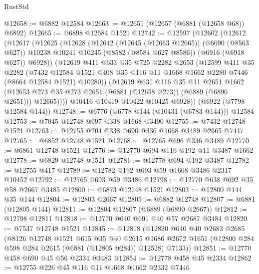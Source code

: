 \begin{lexlean}{RustStd}
\begin{coremodule}
@12658 := @6882 @12584
@12663 := @12651 (@12657 (@6881 (@12658 @68)) @6892)
@12665 := @6898 @12584 @1521
@12742 := @12597
    (@12602
      (@12612
        (@12617
          (@12625
            (@12628
              (@12642
                (@12645 (@12663 @12665))
                (@6690 (@8563 @627))
                @10238
                @10241
                @10245
                (@8582 (@8584 @627 @8586))
                (@6916 (@6918 @627))
                @6928))
            (@12619
              @411
              @633
              @35
              @725
              @2282
              @2653
              (@12599
                @411
                @35
                @2282
                (@7432
                  @12584
                  @1521
                  @408
                  @35
                  @116
                  @11
                  @1668
                  @1662
                  @2280
                  @7446
                  (@8664 @12584 @1521)
                  @10280))
              (@12619
                @631
                @116
                @35
                @11
                @2651
                @1662
                (@12653 @273 @35 @273 @2651 (@6881 (@12658 @273)) (@6889 (@6890 @2651)))
                @12665))))
        @10416
        @10419
        @10422
        @10425
        @6928))
    (@6922 (@7798 @12584 @144))
@12748 := @6776 (@6778 @144 (@10431 (@6783 @144))) @12584
@12753 := @7045 @12748 @697 @338 @1668 @3490
@12755 := @7432 @12748 @1521
@12763 := @12755 @204 @338 @696 @336 @1668 @3489 @2665 @7447
@12765 := @6852 @12748 @1521
@12768 := @12765 @696 @336 @3489
@12770 := @6861 @12748 @1521
@12776 := @12770 @694 @116 @192 @11 @3487 @1662
@12778 := @6829 @12748 @1521
@12781 := @12778 @694 @192 @3487
@12782 := @12755 @417
@12789 := @12782 @192 @693 @59 @1668 @3486 @2317 @10452
@12792 := @12765 @693 @59 @3486
@12798 := @12770 @638 @692 @35 @58 @2667 @3485
@12800 := @6873 @12748 @1521
@12803 := @12800 @144 @35 @144
@12804 := @12803 @2667
@12805 := @6882 @12748
@12807 := @6881 (@12805 @144)
@12811 := @12804 @12807 (@6889 (@6890 @2667))
@12812 := @12798 @12811
@12818 := @12770 @640 @691 @40 @57 @2687 @3484
@12820 := @7537 @12748 @1521
@12845 := @12818
    (@12820
      @640
      @40
      @2683
      @2685
      (@8126
        @12748
        @1521
        @615
        @35
        @40
        @2615
        @1686
        @2672
        @1651
        (@12800 @284 @598 @284 @2615 (@6881 (@12805 @284)) @12528)
        @7133))
@12851 := @12770 @458 @690 @45 @56 @2334 @3483
@12854 := @12778 @458 @45 @2334
@12862 := @12755 @226 @45 @116 @11 @1668 @1662 @2332 @7446

\end{coremodule}
\end{lexlean}
